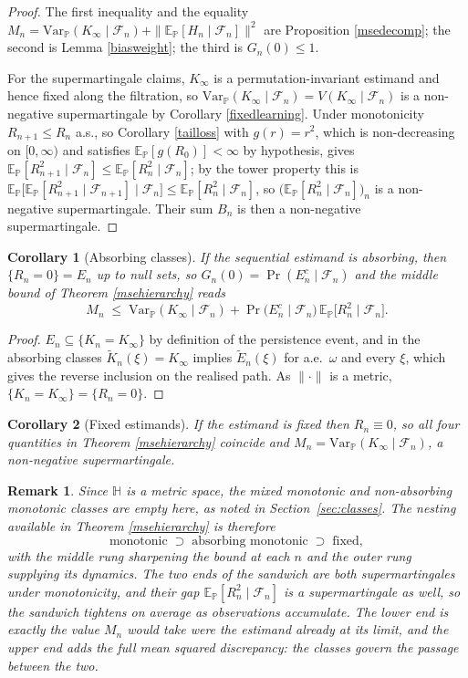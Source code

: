 \documentclass{article}
\newcommand{\Var}{\mathrm{Var}_{\mathbb{P}}}
\newcommand{\E}{\mathbb{E}_{\mathbb{P}}}
\newcommand{\F}{\mathcal{F}}
\newcommand{\1}{\mathbbm{1}}
\newtheorem{remark}{Remark}
\newtheorem{cor}{Corollary}
\begin{document}
\begin{proof}
The first inequality and the equality $M_n=\Var(K_\infty\mid\F_n)+\|\E[H_n\mid\F_n]\|^2$ are
Proposition \ref{msedecomp}; the second is Lemma \ref{biasweight}; the third is $G_n(0)\le1$.

For the supermartingale claims, $K_\infty$ is a permutation-invariant estimand and hence fixed along
the filtration, so $\Var(K_\infty\mid\F_n)=V(K_\infty\mid\F_n)$ is a non-negative supermartingale by
Corollary \ref{fixedlearning}. Under monotonicity $R_{n+1}\le R_n$ a.s., so Corollary
\ref{tailloss} with $g(r)=r^2$, which is non-decreasing on $[0,\infty)$ and satisfies
$\E[g(R_0)]<\infty$ by hypothesis, gives $\E[R_{n+1}^2\mid\F_n]\le\E[R_n^2\mid\F_n]$; by the tower
property this is $\E\big[\E[R_{n+1}^2\mid\F_{n+1}]\mid\F_n\big]\le\E[R_n^2\mid\F_n]$, so
$\big(\E[R_n^2\mid\F_n]\big)_n$ is a non-negative supermartingale. Their sum $B_n$ is then a
non-negative supermartingale.
\end{proof}

\begin{cor}[Absorbing classes]
\label{mseabsorbing}
If the sequential estimand is absorbing, then $\{R_n=0\}=E_n$ up to null sets, so
$G_n(0)=\Pr(E_n^c\mid\F_n)$ and the middle bound of Theorem \ref{msehierarchy} reads
\[
M_n\;\le\;\Var(K_\infty\mid\F_n)+\Pr\big(E_n^c\mid\F_n\big)\,\E\big[R_n^2\mid\F_n\big].
\]
\end{cor}

\begin{proof}
$E_n\subseteq\{K_n=K_\infty\}$ by definition of the persistence event, and in the absorbing classes
$\widetilde K_n(\xi)=K_\infty$ implies $\widetilde E_n(\xi)$ for a.e.\ $\omega$ and every $\xi$,
which gives the reverse inclusion on the realised path. As $\|\cdot\|$ is a metric,
$\{K_n=K_\infty\}=\{R_n=0\}$.
\end{proof}

\begin{cor}[Fixed estimands]
\label{msefixed}
If the estimand is fixed then $R_n\equiv0$, so all four quantities in Theorem \ref{msehierarchy}
coincide and $M_n=\Var(K_\infty\mid\F_n)$, a non-negative supermartingale.
\end{cor}

\begin{remark}
Since $\mathbb{H}$ is a metric space, the mixed monotonic and non-absorbing monotonic classes are
empty here, as noted in Section~\ref{sec:classes}. The nesting available in Theorem
\ref{msehierarchy} is therefore
\[
\text{monotonic}\;\supset\;\text{absorbing monotonic}\;\supset\;\text{fixed},
\]
with the middle rung sharpening the bound at each $n$ and the outer rung supplying its dynamics.
The two ends of the sandwich are both supermartingales under monotonicity, and their gap
$\E[R_n^2\mid\F_n]$ is a supermartingale as well, so the sandwich tightens on average as
observations accumulate. The lower end is exactly the value $M_n$ would take were the estimand
already at its limit, and the upper end adds the full mean squared discrepancy: the classes govern
the passage between the two.
\end{remark}
\end{document}
